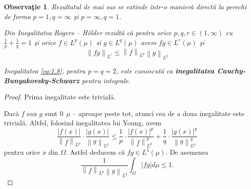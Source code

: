 \documentclass[a4paper,12pt,oneside]{report}
\newtheorem{remark}{Observa\c{t}ie}
\begin{document}
\begin{remark}
  Rezultatul de mai sus se extinde \^{i}ntr-o manier\u{a} direct\u{a} la perechi de forma \(p = 1, q = \infty\) \c{s}i \(p = \infty, q = 1\).
  
Din Inegalitatea Rogers – Hölder rezult\u{a} c\u{a} pentru orice \(p, q, r \in \left ( 1 , \infty  \right )\) cu \(\frac{1}{p} + \frac{1}{q} = 1\) \c{s}i orice \(f\in L^{p}\left ( \mu  \right )\) si \(g\in L^{q}\left ( \mu  \right )\) avem \(fg\in L^{r}\left ( \mu  \right )\) \c{s}i
\begin{displaymath}
  \left \| fg \right \|_{L^{r}}\leq \left \| f \right \|_{L^{p}}\left \| g \right \|_{L^{q}} \label{eq:1.8} \tag{1.8}
\end{displaymath}


Inegalitatea \ref{eq:1.8}, pentru \(p = q = 2\), este cunoscut\u{a} ca \textbf{inegalitatea Cauchy-Bunyakovsky-Schwarz} pentru integrale.
\end{remark}
\begin{proof}
Prima inegalitate este trivial\u{a}.

Dac\u{a} \(f\) sau \(g\) sunt \(0~~ \mu\) – aproape peste tot, atunci cea de a doua inegalitate este trivial\u{a}. Altfel, folosind inegalitatea lui Young, avem
\begin{displaymath}
  \frac{\left | f\left ( x \right ) \right |}{\left \| f \right \|_{L^{p}}} \cdot \frac{\left | g\left ( x \right ) \right |}{\left \| g \right \|_{L^{q}}}\leq \frac{1}{p}\cdot \frac{\left | f\left ( x \right ) \right |^{p}}{\left \| f \right \|^{p}_{L^{p}}} + \frac{1}{q}\cdot \frac{\left | g\left ( x \right ) \right |^{q}}{\left \| g \right \|^{q}_{L^{q}}}
\end{displaymath}
 pentru orice \(x\) din \(\Omega\). Astfel deducem c\u{a} \(fg \in L^{1}\left ( \mu  \right )\). De asemenea
\begin{displaymath}
  \frac{1}{\left \| f \right \|_{L^{p}}\left \| g \right \|_{L^{q}}}\int_{\Omega }\left | fg \right |d\mu \leq 1.
\end{displaymath}
\end{proof}
\end{document}
